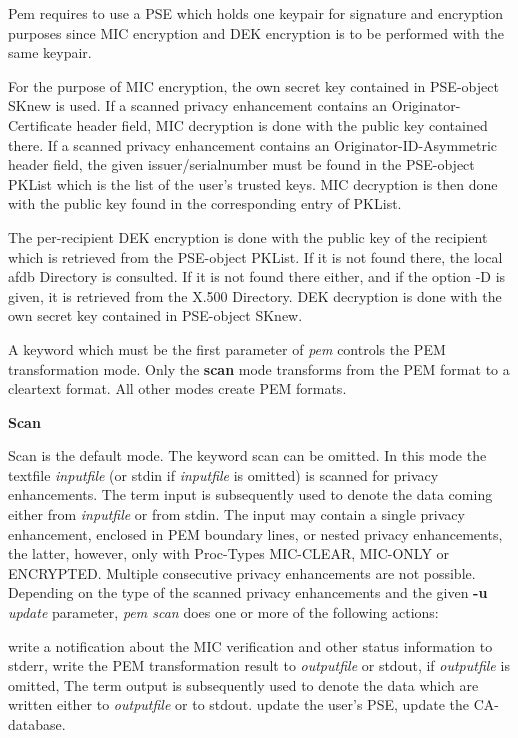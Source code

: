 Pem requires to use a PSE which holds one keypair for signature and encryption purposes since
MIC encryption and DEK encryption is to be performed with the same keypair. 

For the purpose of
MIC encryption, the own secret key contained in PSE-object SKnew is used. If a scanned
privacy enhancement contains an Originator-Certificate header field, MIC decryption
is done with the public key contained there. If a scanned privacy enhancement contains an 
Originator-ID-Asymmetric header field, the given issuer/serialnumber must be found in
the PSE-object PKList which is the list of the user's trusted keys. MIC decryption
is then done with the public key found in the corresponding entry of PKList.

The per-recipient DEK encryption is done with the public key of the recipient which is retrieved
from the PSE-object PKList. If it is not found there, the local afdb Directory is consulted.
If it is not found there either, and if the option -D is given, it is retrieved from
the X.500 Directory. DEK decryption is done with the own secret key contained in PSE-object
SKnew. 

A keyword which must be the first parameter of {\em pem} controls the PEM transformation mode.
Only the {\bf scan} mode transforms from the PEM format to a cleartext format. All other
modes create PEM formats.  

{\large\bf Scan}

Scan is the default mode. The keyword scan can be omitted. In this mode the textfile {\em inputfile}
(or stdin if {\em inputfile} is omitted) is scanned for privacy enhancements. The term input is
subsequently used to denote the data coming either from {\em inputfile} or from stdin. The input
may contain a single privacy enhancement, enclosed in PEM boundary lines, or nested privacy
enhancements, the latter, however, only with Proc-Types MIC-CLEAR, MIC-ONLY or ENCRYPTED.
Multiple consecutive privacy enhancements are not possible. Depending on the type of the scanned
privacy enhancements and the given {\bf -u} {\em update} parameter, {\em pem scan} does one or
more of the following actions:

\bi
\m write a notification about the MIC verification and other status information to stderr,
\m write the PEM transformation result to {\em outputfile} or stdout, if {\em outputfile} is omitted,
   The term output is subsequently used to denote the data which are written either to
   {\em outputfile} or to stdout.
\m update the user's PSE,
\m update the CA-database.
\ei

